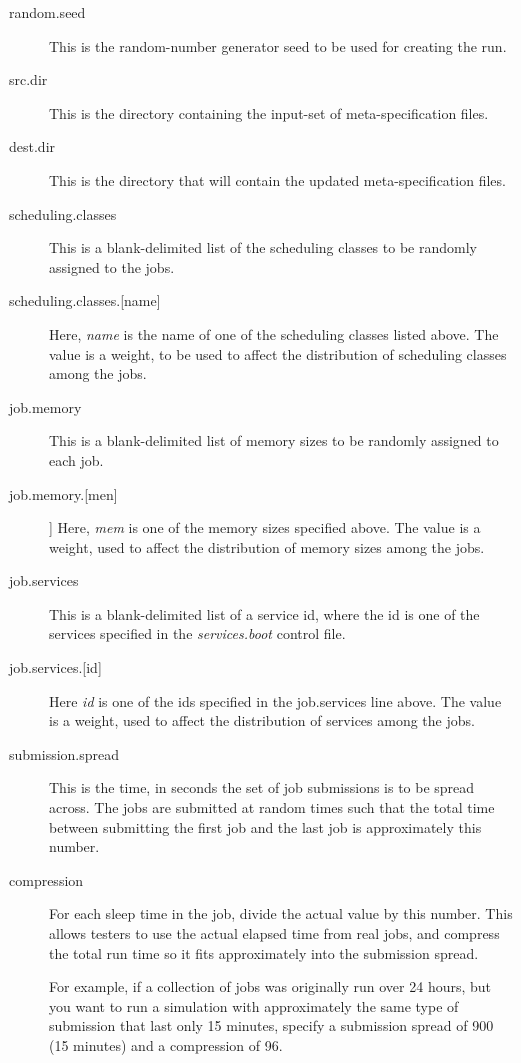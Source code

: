      \begin{description}
       \item[random.seed] This is the random-number generator seed to be used for
         creating the run.
       \item[src.dir] This is the directory containing the input-set of meta-specification
         files.
       \item[dest.dir] This is the directory that will contain the updated meta-specification
         files.
       \item[scheduling.classes] This is a blank-delimited list of the scheduling classes to
         be randomly assigned to the jobs.  
       \item[scheduling.classes.{[name]}] Here, {\em name} is the name of one of the 
         scheduling classes listed above.  The value is a weight, to be used to affect
         the distribution of scheduling classes among the jobs.
       \item[job.memory] This is a blank-delimited list of memory sizes to be randomly
         assigned to each job.
       \item[job.memory.{[men]}]] Here, {\em mem} is one of the memory sizes specified
         above.  The value is a weight, used to affect the distribution of memory sizes
         among the jobs.
       \item[job.services] This is a blank-delimited list of a service id, where the id
         is one of the services specified in the {\em services.boot} control file.
       \item[job.services.{[id]}] Here {\em id} is one of the ids specified in the
         job.services line above.  The value is a weight, used to affect the distribution
         of services among the jobs.

       \item[submission.spread]  This is the time, in seconds the set of job submissions
         is to be spread across.  The jobs are submitted at random times such that the
         total time between submitting the first job and the last job is approximately
         this number.
       \item[compression] For each sleep time in the job, divide the actual value by 
         this number.  This allows testers to use the actual elapsed time from real
         jobs, and compress the total run time so it fits approximately into the submission
         spread.

         For example, if a collection of jobs was originally run over 24 hours, but 
         you want to run a simulation with approximately the same type of submission
         that last only 15 minutes, specify a submission spread of 900 (15 minutes) and
         a compression of 96.
     \end{description}


